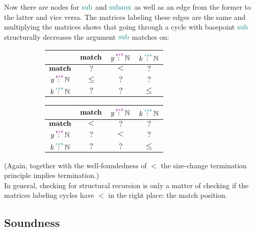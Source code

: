 Now there are nodes for $\sub$ and $\subaux$ as well as an edge from the former to the latter and vice versa.
The matrices labeling these edges are the same and multiplying the matrices shows that going through a cycle with basepoint $\sub$ structurally decreases the argument $\sub$ matches on:

\begin{figure}[H]
  \begin{subfigure}[t]{0.5\textwidth}
    \scriptsize
    \begin{tabular}{c|ccc}
        \diagbox{$\sub(\subaux$)}{$\subaux(\sub)$}
      & $\mathbf{match}$
      & $y \prd \Nat$
      & $k \con \Nat$
      \\
      \hline
        $\mathbf{match}$
      & $?$
      & $<$
      & $?$
      \\
        $y \prd \Nat$
      & $\leq$
      & $?$
      & $?$
      \\
        $k \con \Nat$
      & $?$
      & $?$
      & $\leq$
      \\
    \end{tabular}
  \end{subfigure}
  \begin{subfigure}[t]{0.4\textwidth}
    \scriptsize
    \begin{tabular}{c|ccc}
        \diagbox{$\sub$}{$\sub$}
      & $\mathbf{match}$
      & $y \prd \Nat$
      & $k \con \Nat$
      \\
      \hline
        $\mathbf{match}$
      & $<$
      & $?$
      & $?$
      \\
        $y \prd \Nat$
      & $?$
      & $<$
      & $?$
      \\
        $k \con \Nat$
      & $?$
      & $?$
      & $\leq$
      \\
    \end{tabular}
  \end{subfigure}
\end{figure}

(Again, together with the well-foundedness of $<$ the size-change termination principle implies termination.)
\\
In general, checking for structural recursion is only a matter of checking if the matrices labeling cycles have $<$ in the right place: the match position.

\subsection{Soundness}
\label{sec:mainideas:sound}

